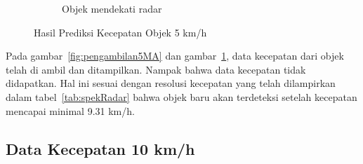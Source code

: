 \begin{figure}
\begin{subfigure}[b]{0.45\textwidth}
		\caption{Objek mendekati radar}
		\label{fig:pengambilan5MT}
    \end{subfigure}
    \caption{Hasil Prediksi Kecepatan Objek 5 km/h}
    \label{fig:pengambilan5}
\end{figure}

Pada gambar~\ref{fig:pengambilan5MA} dan gambar~\ref{fig:pengambilan5MT}, data kecepatan dari objek telah di ambil dan ditampilkan. Nampak bahwa data kecepatan tidak didapatkan. Hal ini sesuai dengan resolusi kecepatan yang telah dilampirkan dalam tabel~\ref{tab:spekRadar} bahwa objek baru akan terdeteksi setelah kecepatan mencapai minimal 9.31 km/h. 

\subsection{Data Kecepatan 10 km/h}

